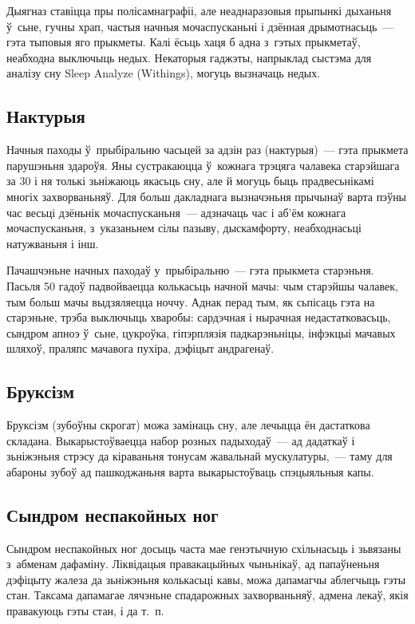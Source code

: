 Дыягназ ставіцца пры полісамнаграфіі, але неаднаразовыя прыпынкі дыханьня ў~сьне, гучны храп, частыя начныя мочаспусканьні і дзённая дрымотнасьць~--- гэта тыповыя яго прыкметы. Калі ёсьць хаця б адна з~гэтых прыкметаў, неабходна выключыць недых. Некаторыя гаджэты, напрыклад сыстэма для аналізу сну Sleep Analyze (Withings), могуць вызначаць недых.

\subsection*{Нактурыя}

Начныя паходы ў~прыбіральню часьцей за адзін раз (нактурыя)~--- гэта прыкмета парушэньня здароўя. Яны сустракаюцца ў~кожнага трэцяга чалавека старэйшага за 30 і ня толькі зьніжаюць якасьць сну, але й могуць быць прадвесьнікамі многіх захворваньняў. Для больш дакладнага вызначэньня прычынаў варта пэўны час весьці дзёньнік мочаспусканьня~--- адзначаць час і аб'ём кожнага мочаспусканьня, з~указаньнем сілы пазыву, дыскамфорту, неабходнасьці натужваньня і інш. 


Пачашчэньне начных паходаў у~прыбіральню~--- гэта прыкмета старэньня. Пасьля 50 гадоў падвойваецца колькасьць начной мачы: чым старэйшы чалавек, тым больш мачы выдзяляецца ноччу. Аднак перад тым, як сьпісаць гэта на старэньне, трэба выключыць хваробы: сардэчная і нырачная недастатковасьць, сындром апноэ ў~сьне, цукроўка, гіпэрплязія падкарэньніцы, інфэкцыі мачавых шляхоў, праляпс мачавога пухіра, дэфіцыт андрагенаў.

\subsection*{Бруксізм}

Бруксізм (зубоўны скрогат) можа замінаць сну, але лечыцца ён дастаткова складана. Выкарыстоўваецца набор розных падыходаў~--- ад дадаткаў і зьніжэньня стрэсу да кіраваньня тонусам жавальнай мускулатуры,~--- таму для абароны зубоў ад пашкоджаньня варта выкарыстоўваць спэцыяльныя капы. 

\subsection*{Сындром неспакойных ног}

Сындром неспакойных ног досыць часта мае генэтычную схільнасьць і зьвязаны з~абменам дафаміну. Ліквідацыя правакацыйных чыньнікаў, ад папаўненьня дэфіцыту жалеза да зьніжэньня колькасьці кавы, можа дапамагчы аблегчыць гэты стан. Таксама дапамагае лячэньне спадарожных захворваньняў, адмена лекаў, якія правакуюць гэты стан, і да т.~п.

